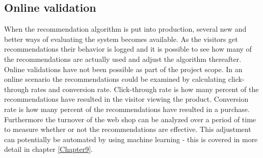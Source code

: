 \subsection{Online validation}
When the recommendation algorithm is put into production, several new and better ways of evaluating the system becomes available. As the visitors get recommendations their behavior is logged and it is possible to see how many of the recommendations are actually used and adjust the algorithm thereafter. Online validations have not been possible as part of the project scope. In an online scenario the recommendations could be examined by calculating click-through rates and conversion rate. Click-through rate is how many percent of the recommendations have resulted in the visitor viewing the product. Conversion rate is how many percent of the recommendations have resulted in a purchase. Furthermore the turnover of the web shop can be analyzed over a period of time to measure whether or not the recommendations are effective.
This adjustment can potentially be automated by using machine learning - this is covered in more detail in chapter \ref{Chapter9}.

 